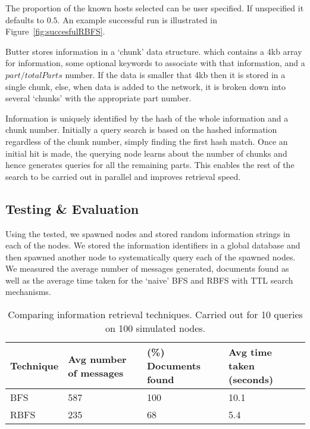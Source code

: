 The proportion of the known hosts selected can be user specified. If unspecified it defaults to $0.5$. An example successful run is illustrated in Figure~\ref{fig:succesfulRBFS}.

Butter stores information in a `chunk' data structure. which contains a 4kb array for information, some optional keywords to associate with that information, and a $part/totalParts$ number. If the data is smaller that 4kb then it is stored in a single chunk, else, when data is added to the network, it is broken down into several `chunks' with the appropriate part number.

Information is uniquely identified by the hash of the whole information and a chunk number. Initially a query search is based on the hashed information regardless of the chunk number, simply finding the first hash match. Once an initial hit is made, the querying node learns about the number of chunks and hence generates queries for all the remaining parts. This enables the rest of the search to be carried out in parallel and improves retrieval speed.

\subsection{Testing \& Evaluation}

Using the tested, we spawned nodes and stored random information strings in each of the nodes. We stored the information identifiers in a global database and then spawned another node to systematically query each of the spawned nodes. We measured the average number of messages generated, documents found as well as the average time taken for the `naive' BFS and RBFS with TTL search mechanisms.

\begin{table}[ht]
    \centering
    \begin{tabular}{|l|l|l|l|}
        \hline
        Technique & Avg number of messages & (\%) Documents found  & Avg time taken (seconds) \\
        \hline
        BFS       & 587               & 100                   & 10.1 \\
        RBFS      & 235                & 68                    & 5.4 \\
        \hline
    \end{tabular}
    \caption{Comparing information retrieval techniques. Carried out for 10 queries on 100 simulated nodes.}
    \label{tab:irTechniques}
\end{table}

